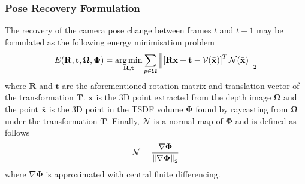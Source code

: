 \subsubsection{Pose Recovery Formulation}
\label{subsub:moseg_static_camera_poserec}
The recovery of the camera pose change between frames $t$ and $t-1$ may be
formulated as the following energy minimisation problem
\begin{equation}
  \label{eqn:pose_estimation_kf}
  E(\mathbf{R}, \mathbf{t}, \mathbf{\Omega}, \mathbf{\Phi}) =
  \operatorname*{arg\,min}_{\mathbf{R}, \mathbf{t}} \sum_{p \in \mathbf{\Omega}}
  \left\lVert\left[
    \mathbf{Rx} + \mathbf{t} - \mathcal{V}(\bar{\mathbf{x}})
  \right]^{T}
  \mathcal{N}(\bar{\mathbf{x}})\right\rVert_{2}
\end{equation}
where $\mathbf{R}$ and $\mathbf{t}$ are the aforementioned rotation matrix and
translation vector of the transformation $\mathbf{T}$. $\mathbf{x}$ is the 3D
point extracted from the depth image $\mathbf{\Omega}$ and the point
$\bar{\mathbf{x}}$ is the 3D point in the TSDF volume $\mathbf{\Phi}$ found by
raycasting from $\mathbf{\Omega}$ under the transformation $\mathbf{T}$.
Finally, $\mathcal{N}$ is a normal map of $\mathbf{\Phi}$ and is defined as
follows
\begin{equation}
  \label{eqn:normal_map_definition}
  \mathcal{N} = \frac{\nabla \mathbf{\Phi}}{\left\lVert\nabla \mathbf{\Phi}\right\rVert_{2}}
\end{equation}
where $\nabla \mathbf{\Phi}$ is approximated with central finite differencing.

